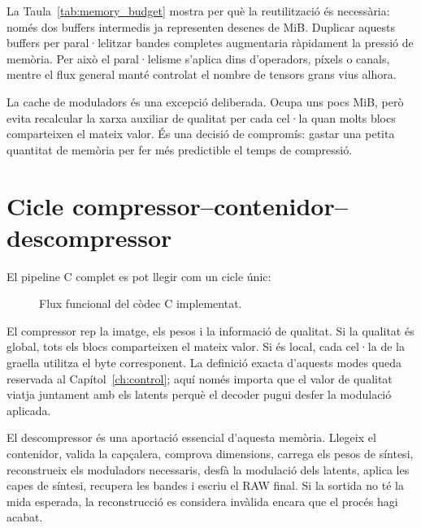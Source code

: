 La Taula~\ref{tab:memory_budget} mostra per què la reutilització és necessària:
només dos buffers intermedis ja representen desenes de MiB. Duplicar aquests
buffers per paral·lelitzar bandes completes augmentaria ràpidament la pressió
de memòria. Per això el paral·lelisme s'aplica dins d'operadors, píxels o
canals, mentre el flux general manté controlat el nombre de tensors grans vius
alhora.

La cache de moduladors és una excepció deliberada. Ocupa uns pocs MiB, però
evita recalcular la xarxa auxiliar de qualitat per cada cel·la quan molts blocs
comparteixen el mateix valor. És una decisió de compromís: gastar una petita
quantitat de memòria per fer més predictible el temps de compressió.

\section{Cicle compressor--contenidor--descompressor}
\label{sec:compressor_c}

El pipeline C complet es pot llegir com un cicle únic:

\begin{figure}[H]
\centering
{}
\caption{Flux funcional del còdec C implementat.}
\label{fig:pipeline_encoder}
\end{figure}

El compressor rep la imatge, els pesos i la informació de qualitat. Si la
qualitat és global, tots els blocs comparteixen el mateix valor. Si és local,
cada cel·la de la graella utilitza el byte corresponent. La definició exacta
d'aquests modes queda reservada al Capítol~\ref{ch:control}; aquí només importa
que el valor de qualitat viatja juntament amb els latents perquè el decoder
pugui desfer la modulació aplicada.

El descompressor és una aportació essencial d'aquesta memòria. Llegeix el
contenidor, valida la capçalera, comprova dimensions, carrega els pesos de
síntesi, reconstrueix els moduladors necessaris, desfà la modulació dels
latents, aplica les capes de síntesi, recupera les bandes i escriu el RAW
final. Si la sortida no té la mida esperada, la reconstrucció es considera
invàlida encara que el procés hagi acabat.

